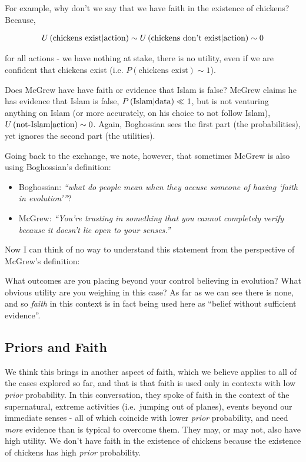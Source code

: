 \documentclass{tufte-book}
\begin{document}
For example, why don't we say that we have faith in the existence of
chickens? Because,

\begin{eqnarray*}
U\left(\mbox{chickens exist}|\mbox{action}\right) \sim U\left(\mbox{chickens don't exist}|\mbox{action}\right)\sim 0
\end{eqnarray*}

for all actions - we have nothing at stake, there is no utility, even if
we are confident that chickens exist (i.e.
\(P(\mbox{chickens exist})\sim 1\)).

Does McGrew have have faith or evidence that Islam is false? McGrew
claims he has evidence that Islam is false, \(P\left(\mbox{Islam}|\mbox{data}\right)\ll 1\),
but is not venturing anything on Islam (or more accurately, on his
choice to not follow Islam), \(U\left(\mbox{not-Islam}|\mbox{action}\right)\sim 0\). Again,
Boghossian sees the first part (the probabilities), yet ignores the
second part (the utilities).

Going back to the exchange, we note, however, that sometimes McGrew is
also using Boghossian's definition:

\begin{itemize}
\itemsep1pt\parskip0pt
\item
  Boghossian: \emph{``what do people mean when they accuse someone of
  having `faith in evolution'''}?
\item
  McGrew: \emph{``You're trusting in something that you cannot
  completely verify because it doesn't lie open to your senses.''}
\end{itemize}

Now I can think of no way to understand this statement from the
perspective of McGrew's definition:

What outcomes are you placing beyond your control believing in
evolution? What obvious utility are you weighing in this case? As far as
we can see there is none, and so \emph{faith} in this context is in fact
being used here as ``belief without sufficient evidence''.

\subsection{Priors and Faith}\label{priors-and-faith}

We think this brings in another aspect of faith, which we believe
applies to all of the cases explored so far, and that is that faith is
used only in contexts with low \emph{prior} probability. In this
conversation, they spoke of faith in the context of the supernatural,
extreme activities (i.e.~jumping out of planes), events beyond our
immediate senses - all of which coincide with lower \emph{prior}
probability, and need \emph{more} evidence than is typical to overcome
them. They may, or may not, also have high utility. We don't have faith
in the existence of chickens because the existence of chickens has high
\emph{prior} probability.
\end{document}
